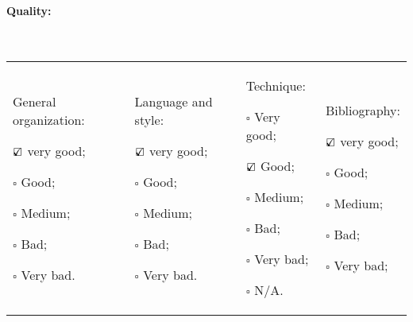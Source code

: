 \documentclass[11pt]{article}
\begin{document}
\paragraph{Quality:} ~\newline
\begin{tabular}{p{}p{}p{}p{}}
\begin{minipage}[t]{.25\textwidth}
General organization:
\begin{description}
\item $\mbox{\ooalign{$\checkmark$\cr\hidewidth$\square$\hidewidth\cr}}$ very good;
\item $\square$ Good;
\item $\square$ Medium;
\item $\square$ Bad;
\item $\square$ Very bad.
\end{description}
\end{minipage}

&

\begin{minipage}[t]{.25\textwidth}
Language and style:
\begin{description}
\item $\mbox{\ooalign{$\checkmark$\cr\hidewidth$\square$\hidewidth\cr}}$ very good;
\item $\square$ Good;
\item $\square$ Medium;
\item $\square$ Bad;
\item $\square$ Very bad.
\end{description}
\end{minipage}

&

\begin{minipage}[t]{.25\textwidth}
Technique:
\begin{description}
\item $\square$ Very good;
\item $\mbox{\ooalign{$\checkmark$\cr\hidewidth$\square$\hidewidth\cr}}$ Good;
\item $\square$ Medium;
\item $\square$ Bad;
\item $\square$ Very bad;
\item $\square$ N/A.
\end{description}
\end{minipage}

&

\begin{minipage}[t]{.25\textwidth}
Bibliography:
\begin{description}
\item $\mbox{\ooalign{$\checkmark$\cr\hidewidth$\square$\hidewidth\cr}}$ very good;
\item $\square$ Good;
\item $\square$ Medium;
\item $\square$ Bad;
\item $\square$ Very bad;
\end{description}
\end{minipage}
\end{tabular}
\end{document}
